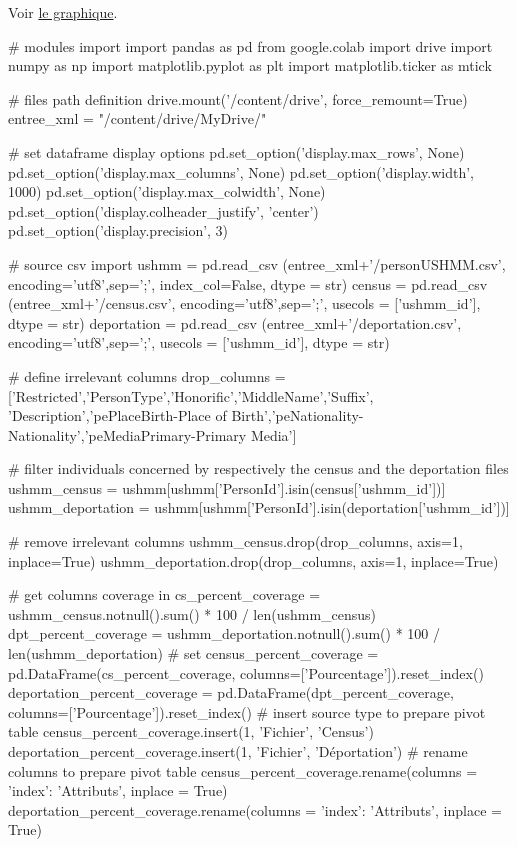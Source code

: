 \documentclass[a4paper,12pt,twoside]{book}
\begin{document}
        Voir \hyperref[fig12]{le graphique}.
        \label{analyse2}
        
            \begin{python}
# modules import
import pandas as pd
from google.colab import drive
import numpy as np
import matplotlib.pyplot as plt
import matplotlib.ticker as mtick

# files path definition
drive.mount('/content/drive', force_remount=True)
entree_xml = "/content/drive/MyDrive/"

# set dataframe display options
pd.set_option('display.max_rows', None)
pd.set_option('display.max_columns', None)
pd.set_option('display.width', 1000)
pd.set_option('display.max_colwidth', None)
pd.set_option('display.colheader_justify', 'center')
pd.set_option('display.precision', 3)

# source csv import
ushmm = pd.read_csv (entree_xml+'/personUSHMM.csv', encoding='utf8',sep=';', index_col=False, dtype = str)
census = pd.read_csv (entree_xml+'/census.csv', encoding='utf8',sep=';', usecols = ['ushmm_id'],  dtype = str)
deportation = pd.read_csv (entree_xml+'/deportation.csv', encoding='utf8',sep=';', usecols = ['ushmm_id'], dtype = str)

# define irrelevant columns
drop_columns = ['Restricted','PersonType','Honorific','MiddleName','Suffix', 'Description','pePlaceBirth-Place of Birth','peNationality-Nationality','peMediaPrimary-Primary Media']

# filter individuals concerned by respectively the census and the deportation files
ushmm_census = ushmm[ushmm['PersonId'].isin(census['ushmm_id'])]
ushmm_deportation = ushmm[ushmm['PersonId'].isin(deportation['ushmm_id'])]

# remove irrelevant columns
ushmm_census.drop(drop_columns, axis=1, inplace=True)
ushmm_deportation.drop(drop_columns, axis=1, inplace=True)

# get columns coverage in %
cs_percent_coverage = ushmm_census.notnull().sum() * 100 / len(ushmm_census)
dpt_percent_coverage = ushmm_deportation.notnull().sum() * 100 / len(ushmm_deportation)
# set %
census_percent_coverage = pd.DataFrame(cs_percent_coverage, columns=['Pourcentage']).reset_index()
deportation_percent_coverage = pd.DataFrame(dpt_percent_coverage, columns=['Pourcentage']).reset_index()
# insert source type to prepare pivot table
census_percent_coverage.insert(1, 'Fichier', 'Census')
deportation_percent_coverage.insert(1, 'Fichier', 'Déportation')
# rename columns to prepare pivot table
census_percent_coverage.rename(columns = {'index': 'Attributs'}, inplace = True)
deportation_percent_coverage.rename(columns = {'index': 'Attributs'}, inplace = True)


\end{python}
\end{document}
